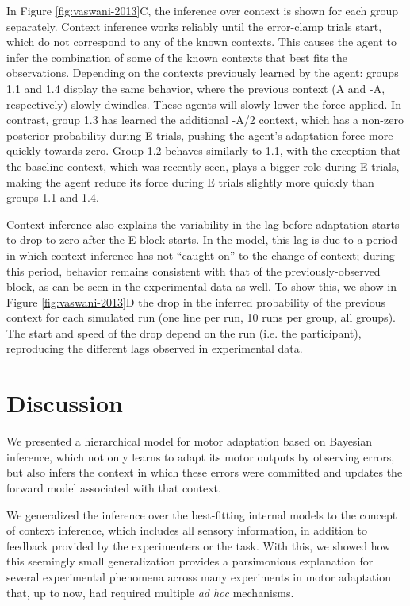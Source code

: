 \documentclass[a4paper,doc,floatsintext,natbib]{apa6}%
\def \fref #1{Figure \ref{#1}}     %
\begin{document}
In \fref{fig:vaswani-2013}C, the inference over context is shown for each group separately. Context inference works reliably until the error-clamp trials start, which do not correspond to any of the known contexts. This causes the agent to infer the combination of some of the known contexts that best fits the observations. Depending on the contexts previously learned by the agent: groups 1.1 and 1.4 display the same behavior, where the previous context (A and -A, respectively) slowly dwindles. These agents will slowly lower the force applied. In contrast, group 1.3 has learned the additional -A/2 context, which has a non-zero posterior probability during E trials, pushing the agent's adaptation force more quickly towards zero. Group 1.2 behaves similarly to 1.1, with the exception that the baseline context, which was recently seen, plays a bigger role during E trials, making the agent reduce its force during E trials slightly more quickly than groups 1.1 and 1.4.

Context inference also explains the variability in the lag before adaptation starts to drop to zero after the E block starts. In the model, this lag is due to a period in which context inference has not ``caught on'' to the change of context; during this period, behavior remains consistent with that of the previously-observed block, as can be seen in the experimental data as well. To show this, we show in \fref{fig:vaswani-2013}D the drop in the inferred probability of the previous context for each simulated run (one line per run, 10 runs per group, all groups). The start and speed of the drop depend on the run (i.e. the participant), reproducing the different lags observed in experimental data.

\section{Discussion}
We presented a hierarchical model for motor adaptation based on Bayesian inference, which not only learns to adapt its motor outputs by observing errors, but also infers the context in which these errors were committed and updates the forward model associated with that context.

We generalized the inference over the best-fitting internal models to the concept of context inference, which includes all sensory information, in addition to feedback provided by the experimenters or the task. With this, we showed how this seemingly small generalization provides a parsimonious explanation for several experimental phenomena across many experiments in motor adaptation that, up to now, had required multiple \textit{ad hoc} mechanisms.
\end{document}
